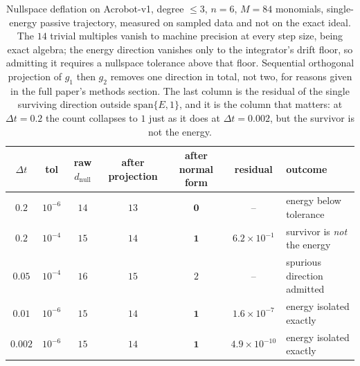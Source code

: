\documentclass{article}
\begin{document}
\begin{table}[t]
\caption{Nullspace deflation on Acrobot-v1, degree $\le 3$, $n=6$, $M=84$
monomials, single-energy passive trajectory, measured on sampled data and not
on the exact ideal. The $14$ trivial multiples vanish to machine precision
at every step size, being exact algebra; the energy direction vanishes only to
the integrator's drift floor, so admitting it requires a nullspace tolerance
above that floor. Sequential orthogonal projection of $g_1$ then $g_2$ removes
one direction in total, not two, for reasons given in the full paper's methods section. The last column is the residual of the single
surviving direction outside $\mathrm{span}\{E, 1\}$, and it is the column that
matters: at $\Delta t = 0.2$ the count collapses to $1$ just as it does at
$\Delta t = 0.002$, but the survivor is not the energy.}
\label{tab:deflation}
\begin{center}
\small
\begin{tabular}{cc|ccc|cl}
$\Delta t$ & tol & raw $d_{\mathrm{null}}$ & after projection
  & after normal form & residual & outcome \\
\hline
$0.2$   & $10^{-6}$  & $14$ & $13$ & $\mathbf{0}$ & --
  & energy below tolerance \\
$0.2$   & $10^{-4}$  & $15$ & $14$ & $\mathbf{1}$ & $6.2\times10^{-1}$
  & survivor is \emph{not} the energy \\
$0.05$  & $10^{-4}$  & $16$ & $15$ & $2$ & --
  & spurious direction admitted \\
$0.01$  & $10^{-6}$  & $15$ & $14$ & $\mathbf{1}$ & $1.6\times10^{-7}$
  & energy isolated exactly \\
$0.002$ & $10^{-6}$  & $15$ & $14$ & $\mathbf{1}$ & $4.9\times10^{-10}$
  & energy isolated exactly \\
\end{tabular}
\end{center}
\end{table}
\end{document}
